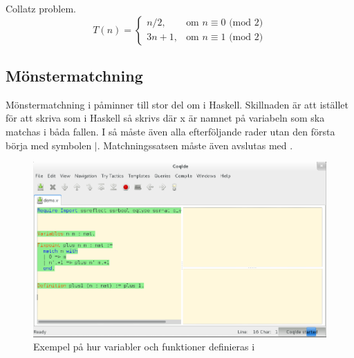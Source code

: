 Collatz problem.
\begin{equation}
T(n) = \left\{\begin{matrix} n/2, & \mbox{om }n\equiv0\mbox{ (mod 2)} \\ 3n+1,
                         & \mbox{om }n\equiv1\mbox{ (mod 2)} \end{matrix}\right.
\end{equation}

\subsection{Mönstermatchning}
Mönstermatchning i \coq påminner till stor del om  i Haskell.
Skillnaden är att istället för att skriva  som i Haskell så skrivs
 där x är namnet på variabeln som ska matchas i båda fallen.
I \coq så måste även alla efterföljande rader utan den första börja med symbolen
$|$. Matchningssatsen måste även avslutas med .

\begin{figure}[H]
  \centering
  \includegraphics[width=150mm]{images/Variables_and_Functions}
  \caption[Variabler och funktioner]
   {Exempel på hur variabler och funktioner definieras i \coq}
\end{figure}

